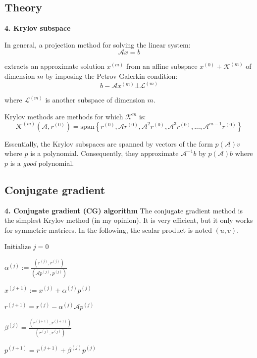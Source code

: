 \subsection{Theory}
\begin{frame}[fragile]{\textbf{4. Krylov subspace}}

In general, a projection method for solving the linear system:
\[
\mathcal{A}x = b
\]

extracts an approximate solution $x^{(m)}$ from an affine subspace $x^{(0)}+\mathcal{K}^{(m)}$ of dimension $m$ by imposing the Petrov-Galerkin condition:
\[
b - \mathcal{A}x^{(m)} \bot \mathcal{L}^{(m)}
\]


where $\mathcal{L}^{(m)}$ is another subspace of dimension $m$.


Krylov methods are methods for which $\mathcal{K}^m$ is:
\[
\mathcal{K}^{(m)} (\mathcal{A},r^{(0)}) = \mathrm{span} \left\{ r^{(0)}, \mathcal{A}r^{(0)}, \mathcal{A}^2r^{(0)}, \mathcal{A}^{3}r^{(0)}, ... , \mathcal{A}^{m-1}r^{(0)}\right\}
\]

Essentially, the Krylov subspaces are spanned by vectors of the form $p(\mathcal{A})v$ where $p$ is a polynomial. Consequently, they approximate $\mathcal{A}^{-1}b$ by $p(\mathcal{A})b$ where $p$ is a \textit{good} polynomial.
\end{frame}

\subsection{Conjugate gradient }


\begin{frame}[fragile]{\textbf{4. Conjugate gradient (CG) algorithm}}
The conjugate gradient method is the simplest Krylov method (in my opinion). It is very efficient, but it only works for symmetric matrices. In the following, the scalar product is noted $(u,v)$.

\vspace{0.5cm}


  \begin{algorithm}[H]

	Initialize $j=0$
	
	{
		$\alpha^{(j)} := \frac{(r^{(j)},r^{(j)})}{(\mathcal{A}p^{(j)},p^{(j)})} $
		
		$x^{(j+1)} := x^{(j)} + \alpha^{(j)}p^{(j)}$
		
		$r^{(j+1)} = r^{(j)} - \alpha^{(j)} \mathcal{A}p^{(j)}$
		
		$\beta^{(j)} = \frac{(r^{(j+1)},r^{(j+1)})}{(r^{(j)},r^{(j)})}$
		
		$p^{(j+1)} = r^{(j+1)} + \beta^{(j)} p^{(j)}$
		
	}
\end{algorithm}
\end{frame}


